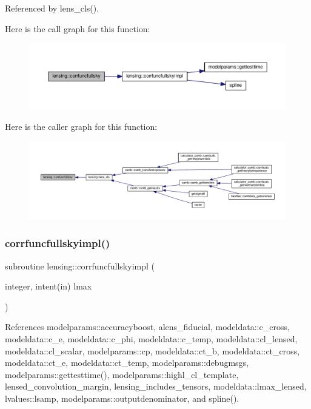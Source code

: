 Referenced by lens\+\_\+cls().

Here is the call graph for this function\+:
\nopagebreak
\begin{figure}[H]
\begin{center}
\leavevmode
\includegraphics[width=350pt]{namespacelensing_a18ba748aa475681b240cdd9be79dd809_cgraph}
\end{center}
\end{figure}
Here is the caller graph for this function\+:
\nopagebreak
\begin{figure}[H]
\begin{center}
\leavevmode
\includegraphics[width=350pt]{namespacelensing_a18ba748aa475681b240cdd9be79dd809_icgraph}
\end{center}
\end{figure}
\mbox{\label{namespacelensing_ae3afbc47d14796e30a26538f38a726dd}} 
\subsubsection{\texorpdfstring{corrfuncfullskyimpl()}{corrfuncfullskyimpl()}}
{\footnotesize\ttfamily subroutine lensing\+::corrfuncfullskyimpl (\begin{DoxyParamCaption}\item[{integer, intent(in)}]{lmax }\end{DoxyParamCaption})\hspace{0.3cm}{\ttfamily [private]}}



References modelparams\+::accuracyboost, alens\+\_\+fiducial, modeldata\+::c\+\_\+cross, modeldata\+::c\+\_\+e, modeldata\+::c\+\_\+phi, modeldata\+::c\+\_\+temp, modeldata\+::cl\+\_\+lensed, modeldata\+::cl\+\_\+scalar, modelparams\+::cp, modeldata\+::ct\+\_\+b, modeldata\+::ct\+\_\+cross, modeldata\+::ct\+\_\+e, modeldata\+::ct\+\_\+temp, modelparams\+::debugmsgs, modelparams\+::gettesttime(), modelparams\+::highl\+\_\+cl\+\_\+template, lensed\+\_\+convolution\+\_\+margin, lensing\+\_\+includes\+\_\+tensors, modeldata\+::lmax\+\_\+lensed, lvalues\+::lsamp, modelparams\+::outputdenominator, and spline().



